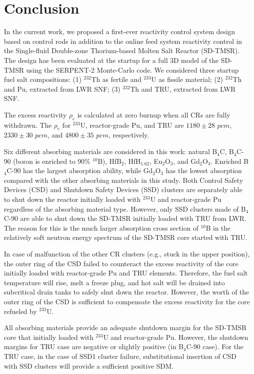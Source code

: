 \section{Conclusion} \label{Conclusion}

In the current work, we proposed a first-ever reactivity control system design based on control rods in addition to the 
online feed system reactivity control in the 
Single-fluid Double-zone Thorium-based Molten Salt Reactor (SD-TMSR). The 
design has been evaluated at the startup for a full 3D model of the SD-TMSR using the
SERPENT-2 Monte-Carlo code. We considered three startup fuel salt compositions:
(1) $^{232}$Th as fertile and $^{233}$U as fissile material; 
(2) $^{232}$Th and Pu, extracted from \gls{LWR} \gls{SNF}; (3) 
$^{232}$Th and TRU, extracted from \gls{LWR} \gls{SNF}.

The excess reactivity $\rho_e$ is calculated at zero burnup when all CRs are 
fully withdrawn. The $\rho_e$ for $^{233}$U, reactor-grade Pu, and 
TRU are $1180\pm28$ $pcm$, $2330\pm30$ $pcm$, and $4800\pm35$ $pcm$, respectively.

Six different absorbing materials are considered in this work:
natural B$_4$C, B$_4$C-90 (boron is enriched to 90\% $^{10}$B), HfB$_2$, 
HfH$_{1.62}$, Eu$_2$O$_3$, and Gd$_2$O$_3$. Enriched B$_4$C-90 has the largest 
absorption ability, while Gd$_2$O$_3$ has the lowest absorption compared with 
the other absorbing materials in this study. Both Control Safety Devices (CSD)
and Shutdown Safety Devices (SSD) clusters are 
separately able to shut down the reactor initially loaded with $^{233}$U and 
reactor-grade Pu regardless of the absorbing material type. However, only SSD 
clusters made of B$_4$C-90 are able to shut down the SD-TMSR initially loaded 
with TRU from \gls{LWR}. The reason for this is the much larger 
absorption cross section of $^{10}$B in the relatively soft neutron energy 
spectrum of the SD-TMSR core started with TRU.

In case of malfunction of the other CR clusters (e.g., stuck in the upper 
position), the outer ring of the CSD failed to counteract the excess 
reactivity of the core initially loaded with reactor-grade Pu and TRU elements. Therefore, the fuel salt temperature will rise, melt a freeze plug, and hot salt will be drained into subcritical drain tanks to safely shut down the reactor.
However, the worth of the outer ring of the CSD is sufficient 
to compensate the excess reactivity for the core refueled by $^{233}$U.

All absorbing materials provide an adequate shutdown margin for the SD-TMSR 
core that initially loaded with $^{233}$U and reactor-grade Pu. However, the 
shutdown margins for TRU case are negative or slightly positive (in B$_4$C-90 
case). For the TRU case, in the case of SSD1 cluster failure, substitutional insertion of CSD with SSD clusters will provide a sufficient positive SDM. 

